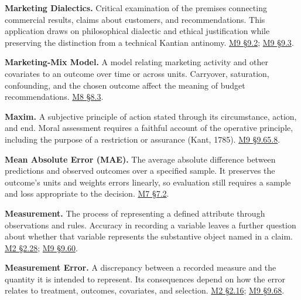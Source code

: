 \noindent\textbf{Marketing Dialectics.} Critical examination of the premises
connecting commercial results, claims about customers, and
recommendations. This application draws on philosophical dialectic and
ethical justification while preserving the distinction from a technical
Kantian antinomy.
\hyperref[M09-transcendental-dialectic-and-the-limits-of-reason]{M9
§9.2};
\hyperref[M09-a-critical-examination-of-marketing-claims]{M9
§9.3}.

\noindent\textbf{Marketing-Mix Model.} A model relating marketing activity and
other covariates to an outcome over time or across units. Carryover,
saturation, confounding, and the chosen outcome affect the meaning of
budget recommendations.
\href{Marketing_Analytics_Lecture_Notes.pdf\#M08-marketing-mix-models-combine-carryover-and-saturation}{M8
§8.3}.

\noindent\textbf{Maxim.} A subjective principle of action stated through its
circumstance, action, and end. Moral assessment requires a faithful
account of the operative principle, including the purpose of a
restriction or assurance (Kant, 1785).
\hyperref[M09-maxims-of-data-production-and-disclosure]{M9
§9.65.8}.

\noindent\textbf{Mean Absolute Error (MAE).} The average absolute difference
between predictions and observed outcomes over a specified sample. It
preserves the outcome's units and weights errors linearly, so evaluation
still requires a sample and loss appropriate to the decision.
\href{Marketing_Analytics_Lecture_Notes.pdf\#M07-baselines-loss-functions-and-regularization}{M7
§7.2}.

\noindent\textbf{Measurement.} The process of representing a defined attribute
through observations and rules. Accuracy in recording a variable leaves
a further question about whether that variable represents the
substantive object named in a claim.
\href{Marketing_Analytics_Lecture_Notes.pdf\#M02-electricity-prices-household-bills-and-the-unit-of-harm}{M2
§2.28};
\hyperref[M09-the-ontology-of-a-dataset]{M9
§9.60}.

\noindent\textbf{Measurement Error.} A discrepancy between a recorded measure and
the quantity it is intended to represent. Its consequences depend on how
the error relates to treatment, outcomes, covariates, and selection.
\href{Marketing_Analytics_Lecture_Notes.pdf\#M02-mcdonalds-measuring-ice-cream-availability}{M2
§2.16};
\hyperref[M09-worked-assessments-of-the-missing-object]{M9
§9.68}.


